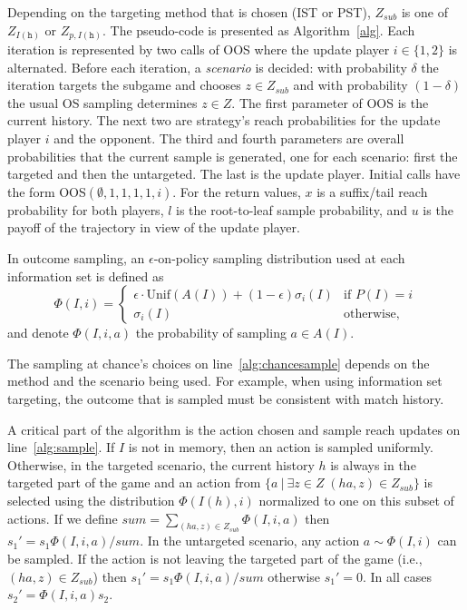 \documentclass{aamas2015}
\newcommand{\tth}{\mathtt{h}}
\begin{document}
Depending on the targeting method that is chosen (IST or PST), $Z_{sub}$ is one of $Z_{I(\tth)}$ or $Z_{p,I(\tth)}$. 
The pseudo-code is presented as Algorithm~\ref{alg}. 
Each iteration is represented by two calls of OOS where the update player $i \in \{1,2\}$ is alternated. 
Before each iteration, a {\it scenario} is decided: 
with probability $\delta$ the iteration targets the subgame and chooses $z \in Z_{sub}$
and with probability $(1-\delta)$ the usual OS sampling determines $z \in Z$. 
The first parameter of OOS is the current history. 
The next two are strategy's reach probabilities for the update player $i$ and the opponent. 
The third and fourth parameters are overall probabilities that the current sample is generated, one for each scenario: first the targeted and then the untargeted.
The last is the update player. Initial calls have the form OOS$(\emptyset, 1, 1, 1, 1, i)$.  
For the return values, $x$ is a suffix/tail reach probability for both players, 
$l$ is the root-to-leaf sample probability, and $u$ is the payoff of the trajectory in view 
of the update player. 

In outcome sampling, an $\epsilon$-on-policy sampling distribution used at each information set
is defined as 
\begin{equation*}
\label{eq:ossample}
\Phi(I,i) = \left\{
\begin{array}{ll}
\epsilon \cdot \mbox{Unif}(A(I)) + (1-\epsilon)\sigma_i(I) & \mbox{if } P(I) = i\\ 
\sigma_i(I)                                          & \mbox{otherwise,}
\end{array} \right.
\end{equation*}
and denote $\Phi(I,i,a)$ the probability of sampling $a \in A(I)$. 

The sampling at chance's choices on line~\ref{alg:chancesample} depends on the method and the scenario being used. For example, when using information set targeting, the outcome that is sampled must be consistent with match history.

A critical part of the algorithm is the action chosen and sample reach updates on line~\ref{alg:sample}. If $I$ is not in memory, then an action is sampled uniformly. Otherwise, in the targeted scenario, the current history $h$ is always in the targeted part of the game and an action from $\{a~|~\exists z\in Z \; (ha,z)\in Z_{sub}\}$ is selected using the distribution $\Phi(I(h),i)$ normalized to one on this subset of actions. If we define $sum=\sum_{(ha,z)\in Z_{sub}}\Phi(I,i,a)$ then $s_1' = s_1\Phi(I,i,a)/sum$. In the untargeted scenario, any action $a \sim \Phi(I,i)$ can be sampled. If the action is not leaving the targeted part of the game (i.e., $(ha,z)\in Z_{sub}$) then $s_1' = s_1\Phi(I,i,a)/sum$ otherwise $s_1'=0$. In all cases $s_2' = \Phi(I,i,a) s_2$.
\end{document}
